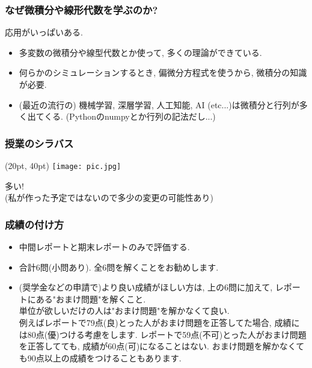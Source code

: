 \documentclass[11pt,dvipdfmx]{beamer}
\theoremstyle{definition}
\theoremstyle{remark}
\begin{document}
\begin{frame}
\frametitle{なぜ微積分や線形代数を学ぶのか?}
   \begin{alertblock}{}
  \begin{center}
応用がいっぱいある.
  \end{center}
 \end{alertblock}
 
  \begin{itemize}
  \item 多変数の微積分や線型代数とか使って, 多くの理論ができている.
  \item  何らかのシミュレーションするとき, 偏微分方程式を使うから, 微積分の知識が必要.
  \item (最近の流行の) 機械学習, 深層学習, 人工知能, AI (etc...)は微積分と行列が多く出てくる.
  {\tiny (Pythonのnumpyとか行列の記法だし...)}
 
  \end{itemize}


\end{frame}

\begin{frame}
\frametitle{授業のシラバス}

\begin{textblock*}{0.4\linewidth}(20pt, 40pt)
    \centering
    \texttt{[image: pic.jpg]}
\end{textblock*}
 \vspace{50mm}
  \begin{alertblock}{}
  \begin{center}
 多い!  \\
 (私が作った予定ではないので多少の変更の可能性あり)
  \end{center}
 \end{alertblock}
\end{frame}

\begin{frame}
\frametitle{成績の付け方}
 \begin{itemize}
 \item 中間レポートと期末レポートのみで評価する. 
 \item 合計6問(小問あり). %
 全6問を解くことをお勧めします. %
 \item (奨学金などの申請で)より良い成績がほしい方は, 上の6問に加えて, レポートにある"おまけ問題"を解くこと. \\
 単位が欲しいだけの人は"おまけ問題"を解かなくて良い. \\
 {\tiny 例えばレポートで79点(良)とった人がおまけ問題を正答してた場合, 成績には80点(優)つける考慮をします.
 レポートで59点(不可)とった人がおまけ問題を正答してても, 成績が60点(可)になることはない. }
{\tiny  おまけ問題を解かなくても90点以上の成績をつけることもあります.}
 \end{itemize}


\end{frame}
\end{document}
